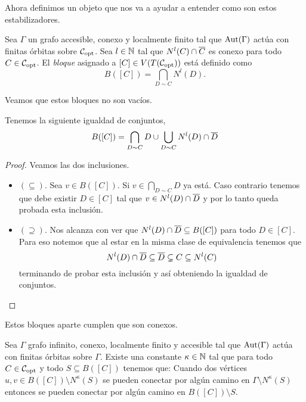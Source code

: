 \documentclass[tesis.tex]{subfiles}
\begin{document}
Ahora definimos un objeto que nos va a ayudar a entender como son estos estabilizadores.

\begin{deff}
	Sea $\Gamma$ un grafo accesible, conexo y localmente finito
	tal que $\text{Aut}(\Gamma)$ actúa con finitas órbitas sobre ${\cal C}_{\text{opt}}$.
	Sea $l \in \mathbb{N}$ tal que $N^l(C) \cap \overline C$ es conexo para todo $C \in {\cal C}_{\text{opt}}$.
	El \emph{bloque} asignado a $[C] \in V(T({\cal C}_{\text{opt}}))$ está definido como
	\[
		B([C]) = \bigcap_{D \sim C} N^l (D).
	\]	
\end{deff}



Veamos que estos bloques no son vacíos.

\begin{lema}\label{lema_bloques_def_equiv}
	Tenemos la siguiente igualdad de conjuntos,
	\[
		B([C]) = \bigcap_{D \sim C} D \cup \bigcup_{D \sim C} N^l(D) \cap \overline D
	\]
\end{lema}

\begin{proof}
	Veamos las dos inclusiones.
	
	\begin{itemize}
		\item \textbf{$(\subseteq)$}. 
		Sea $v \in B([C])$. 
		Si $v \in \bigcap_{D \sim C} D$ ya está. 
		Caso contrario tenemos que debe existir $D \in [C]$ tal que $v \in N^l(D) \cap \overline D$ y por lo tanto queda probada esta inclusión.
		\item \textbf{$(\supseteq)$}. 
		Nos alcanza con ver que $ N^l(D) \cap \overline D \subseteq B([C])$ para todo $D \in [C]$.
		Para eso notemos que al estar en la misma clase de equivalencia tenemos que 
		\[
			N^l(D) \cap \overline D \subseteq \overline D \subsetneq C \subseteq N^l(C)
		\]
		terminando de probar esta inclusión y así obteniendo la igualdad de conjuntos.
	\end{itemize}
\end{proof}




Estos bloques aparte cumplen que son conexos.

\begin{lema}\label{lema_conexion_B(C)}
	Sea $\Gamma$ grafo infinito, conexo, localmente finito y accesible tal que $\text{Aut}(\Gamma)$ actúa con finitas órbitas sobre $\Gamma$.
	Existe una constante $\kappa \in \mathbb{N}$ tal que para todo $C \in {\cal C}_{\text{opt}}$ y todo $S \subseteq B([C])$ tenemos que: 
	Cuando dos vértices $u,v \in B([C]) \setminus N^\kappa(S)$ se pueden conectar por algún camino en $\Gamma \setminus N^{\kappa}(S)$ entonces se pueden conectar por algún camino en $B([C]) \setminus S$. 
\end{lema}
\end{document}

